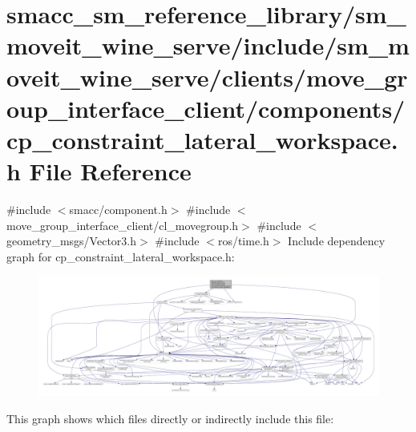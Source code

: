 \hypertarget{sm__moveit__wine__serve_2include_2sm__moveit__wine__serve_2clients_2move__group__interface__clie53c77a9ae8e0cbc82640166beca74822}{}\section{smacc\+\_\+sm\+\_\+reference\+\_\+library/sm\+\_\+moveit\+\_\+wine\+\_\+serve/include/sm\+\_\+moveit\+\_\+wine\+\_\+serve/clients/move\+\_\+group\+\_\+interface\+\_\+client/components/cp\+\_\+constraint\+\_\+lateral\+\_\+workspace.h File Reference}
\label{sm__moveit__wine__serve_2include_2sm__moveit__wine__serve_2clients_2move__group__interface__clie53c77a9ae8e0cbc82640166beca74822}
{\ttfamily \#include $<$smacc/component.\+h$>$}\newline
{\ttfamily \#include $<$move\+\_\+group\+\_\+interface\+\_\+client/cl\+\_\+movegroup.\+h$>$}\newline
{\ttfamily \#include $<$geometry\+\_\+msgs/\+Vector3.\+h$>$}\newline
{\ttfamily \#include $<$ros/time.\+h$>$}\newline
Include dependency graph for cp\+\_\+constraint\+\_\+lateral\+\_\+workspace.\+h\+:
\nopagebreak
\begin{figure}[H]
\begin{center}
\leavevmode
\includegraphics[width=350pt]{sm__moveit__wine__serve_2include_2sm__moveit__wine__serve_2clients_2move__group__interface__clie0ecb9b0c1718246cc46a498c76daebef}
\end{center}
\end{figure}
This graph shows which files directly or indirectly include this file\+:
